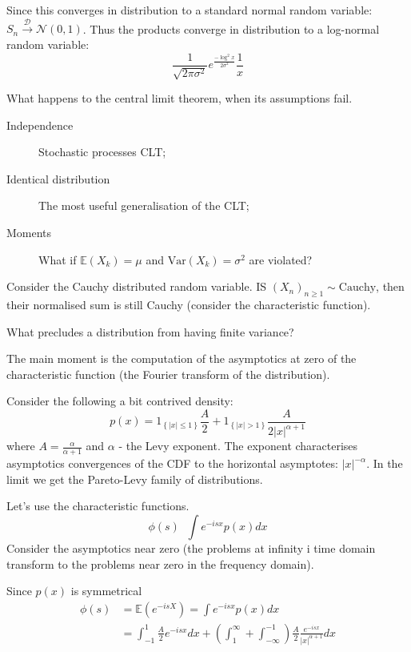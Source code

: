 \documentclass[a4paper]{article}
\newcommand{\obj}[1]{{\left\{ #1 \right \}}}
\newcommand{\brac}[1]{{\left ( #1 \right )}}
\newcommand{\abs}[1]{{\left | #1 \right |}}
\newcommand{\Ex}{\mathbb{E}}
\newcommand{\defn}{\mathop{\overset{\Delta}{=}}\nolimits}
\begin{document}
Since this converges in distribution to a standard normal random variable: $S_n \overset{\mathcal{D}}{\to} \mathcal{N}(0,1)$. Thus the products converge in distribution to a log-normal random variable:
\[\frac{1}{\sqrt{2\pi\sigma^2}} e^\frac{-\log^2 x}{2\sigma^2}\frac{1}{x}\]

What happens to the central limit theorem, when its assumptions fail.
\begin{description}
	\item[Independence] Stochastic processes CLT;
	\item[Identical distribution] The most useful generalisation of the CLT;
	\item[Moments] What if $\Ex(X_k) = \mu$ and $\text{Var}(X_k) = \sigma^2$ are violated?
\end{description}

Consider the Cauchy distributed random variable. IS $\brac{X_n}_{n\geq1}\sim \text{Cauchy}$, then their normalised sum is still Cauchy (consider the characteristic function).

What precludes a distribution from having finite variance?

The main moment is the computation of the asymptotics at zero of the characteristic function (the Fourier transform of the distribution).

Consider the following a bit contrived density:
\[p(x) = 1_\obj{\abs{x}\leq 1}\frac{A}{2} + 1_\obj{\abs{x}>1}\frac{A}{2\abs{x}^{\alpha+1}}\]
where $A=\frac{\alpha}{\alpha+1}$ and $\alpha$ - the Levy exponent. The exponent characterises asymptotics convergences of the CDF to the horizontal asymptotes: $\abs{x}^{-\alpha}$. In the limit we get the Pareto-Levy family of distributions.

Let's use the characteristic functions.
\[\phi(s)\defn\int e^{-isx}p(x)dx\]
Consider the asymptotics near zero (the problems at infinity i time domain transform to the problems near zero in the frequency domain).

Since $p(x)$ is symmetrical
\begin{align*}
	\phi(s) &= \Ex\brac{e^{-isX} } = \int e^{-isx}p(x)dx \\
	&= \int_{-1}^1 \frac{A}{2} e^{-isx} dx + \brac{\int_1^\infty + \int_{-\infty}^{-1}} \frac{A}{2} \frac{e^{-isx} }{\abs{x}^{\alpha+1}} dx
\end{align*}
\end{document}
